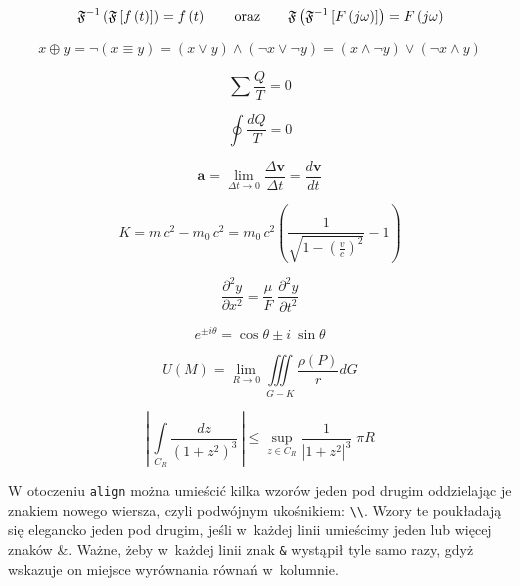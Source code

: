 \[
    \mathfrak{F}^{-1}\left(\mathfrak{F} \left[ f\left(t \right ) \right ] \right ) = f \left(t \right )
    \qquad \textup{oraz} \qquad
    \mathfrak{F}\left(\mathfrak{F}^{-1} \left[ F\left(j\omega \right ) \right ] \right ) = F \left(j\omega \right )
\]

\begin{equation*}
    x \oplus y = \neg (x \equiv y) = (x \vee y) \wedge (\neg x \vee \neg y) = (x \wedge \neg y) \vee (\neg x \wedge y)
\end{equation*}

\begin{equation*}
    \sum \frac{Q}{T} = 0
\end{equation*}

\begin{equation}
    \oint \frac{dQ}{T} = 0
\end{equation}

\begin{equation}
    \pmb{a} = \lim\limits_{\Delta t \to 0} \frac{\Delta \pmb{v}}{\Delta t} = \frac{d\pmb{v}}{dt}
\end{equation}

\begin{equation}
    K = m\,c^2 - m_0\,c^2
    = m_0\,c^2 \left(
    \frac{1}{ \sqrt{1 - \left( \frac{v}{c} \right)^2 } } -1
    \right)
\end{equation}

\begin{equation}
    \frac{\partial^2 y}{\partial x^2} = \frac{\mu}{F} \; \frac{\partial^2 y}{\partial t^2}
\end{equation}

\begin{equation}
    e^{\pm i\theta} = \cos \theta \pm i~\sin\theta
\end{equation}

\begin{equation}
    U(M) = \lim\limits_{R\to 0} \iiint\limits_{G-K}\frac{\rho(P)}{r}dG
\end{equation}

\begin{equation*}
    \left| \, \int\limits_{C_R} \frac{dz}{\left( 1+z^2 \right )^3} \, \right| \leqslant \sup\limits_{z \in C_R}
    \frac{1}{\left| 1+z^2 \right|^3} \; \pi R
\end{equation*}

W otoczeniu \texttt{align}
można umieścić kilka wzorów jeden pod drugim oddzielając je znakiem nowego wiersza, czyli podwójnym ukośnikiem:
\texttt{\textbackslash{}\textbackslash{}}.
Wzory te poukładają się elegancko jeden pod drugim, jeśli w~każdej linii umieścimy jeden lub więcej znaków \&.
Ważne, żeby w~każdej linii znak \texttt{\&}
wystąpił tyle samo razy, gdyż wskazuje on miejsce wyrównania równań w~kolumnie.


